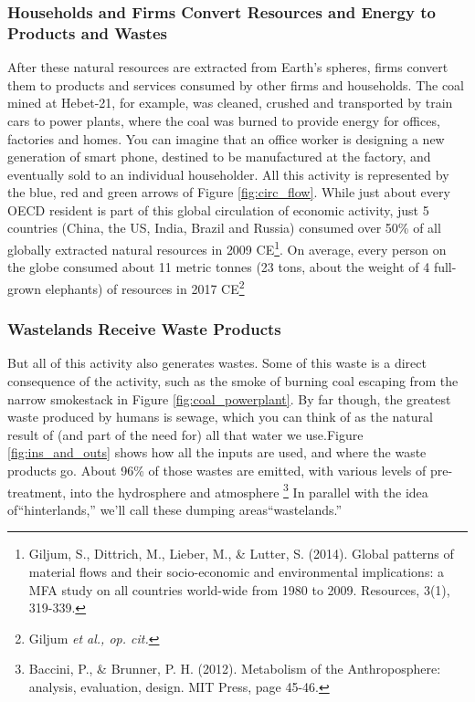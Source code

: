 \subsubsection{Households and Firms Convert Resources and Energy to Products and Wastes}
After these natural resources are extracted from Earth's spheres, firms convert them to products and services consumed by other firms and households. The coal mined at Hebet-21, for example, was cleaned, crushed and transported by train cars to power plants, where the coal was burned to provide energy for offices, factories and homes. You can imagine that an office worker is designing a new generation of smart phone, destined to be manufactured at the factory, and eventually sold to an individual householder. All this activity is represented by the blue, red and green arrows of Figure \ref{fig:circ_flow}. While just about every OECD resident is part of this global circulation of economic activity, just 5 countries (China, the US, India, Brazil and Russia) consumed over 50\% of all globally extracted natural resources in 2009 CE\footnote{Giljum, S., Dittrich, M., Lieber, M., \& Lutter, S. (2014). Global patterns of material flows and their socio-economic and environmental implications: a MFA study on all countries world-wide from 1980 to 2009. Resources, 3(1), 319-339.}. On average, every person on the globe consumed about 11 metric tonnes (23 tons, about the weight of 4 full-grown elephants) of resources in 2017 CE\footnote{Giljum \textit{et al., op. cit.}}\\

\subsubsection{Wastelands Receive Waste Products}
But all of this activity also generates wastes. Some of this waste is a direct consequence of the activity, such as the smoke of burning coal escaping from the narrow smokestack in Figure \ref{fig:coal_powerplant}. By far though, the greatest waste produced by humans is sewage, which you can think of as the natural result of (and part of the need for) all that water we use.Figure \ref{fig:ins_and_outs} shows how all the inputs are used, and where the waste products go. About 96\% of those wastes are emitted, with various levels of pre-treatment, into the hydrosphere and atmosphere \footnote{Baccini, P., \& Brunner, P. H. (2012). Metabolism of the Anthroposphere: analysis, evaluation, design. MIT Press, page 45-46.} In parallel with the idea of``hinterlands,'' we'll call these dumping areas``wastelands.'' \\

